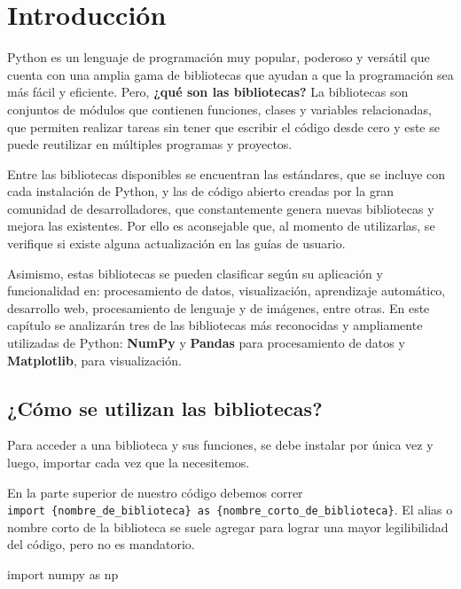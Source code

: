 \documentclass[
  letterpaper,
  DIV=11,
  numbers=noendperiod]{scrreprt}
\newenvironment{Shaded}{\begin{snugshade}}{\end{snugshade}}
\newcommand{\ImportTok}[1]{\textcolor[rgb]{0.00,0.46,0.62}{#1}}
\newcommand{\NormalTok}[1]{\textcolor[rgb]{0.00,0.23,0.31}{#1}}
\begin{document}
\section{Introducción}\label{introducciuxf3n-1}

Python es un lenguaje de programación muy popular, poderoso y versátil
que cuenta con una amplia gama de bibliotecas que ayudan a que la
programación sea más fácil y eficiente. Pero, \textbf{¿qué son las
bibliotecas?} La bibliotecas son conjuntos de módulos que contienen
funciones, clases y variables relacionadas, que permiten realizar tareas
sin tener que escribir el código desde cero y este se puede reutilizar
en múltiples programas y proyectos.

Entre las bibliotecas disponibles se encuentran las estándares, que se
incluye con cada instalación de Python, y las de código abierto creadas
por la gran comunidad de desarrolladores, que constantemente genera
nuevas bibliotecas y mejora las existentes. Por ello es aconsejable que,
al momento de utilizarlas, se verifique si existe alguna actualización
en las guías de usuario.

Asimismo, estas bibliotecas se pueden clasificar según su aplicación y
funcionalidad en: procesamiento de datos, visualización, aprendizaje
automático, desarrollo web, procesamiento de lenguaje y de imágenes,
entre otras. En este capítulo se analizarán tres de las bibliotecas más
reconocidas y ampliamente utilizadas de Python: \textbf{NumPy} y
\textbf{Pandas} para procesamiento de datos y \textbf{Matplotlib}, para
visualización.

\subsection{¿Cómo se utilizan las
bibliotecas?}\label{cuxf3mo-se-utilizan-las-bibliotecas}

Para acceder a una biblioteca y sus funciones, se debe instalar por
única vez y luego, importar cada vez que la necesitemos.

En la parte superior de nuestro código debemos correr
\texttt{import\ \{nombre\_de\_biblioteca\}\ as\ \{nombre\_corto\_de\_biblioteca\}}.
El alias o nombre corto de la biblioteca se suele agregar para lograr
una mayor legilibilidad del código, pero no es mandatorio.

\begin{Shaded}
\begin{Highlighting}[]
\ImportTok{import}\NormalTok{ numpy }\ImportTok{as}\NormalTok{ np}
\end{Highlighting}
\end{Shaded}
\end{document}
